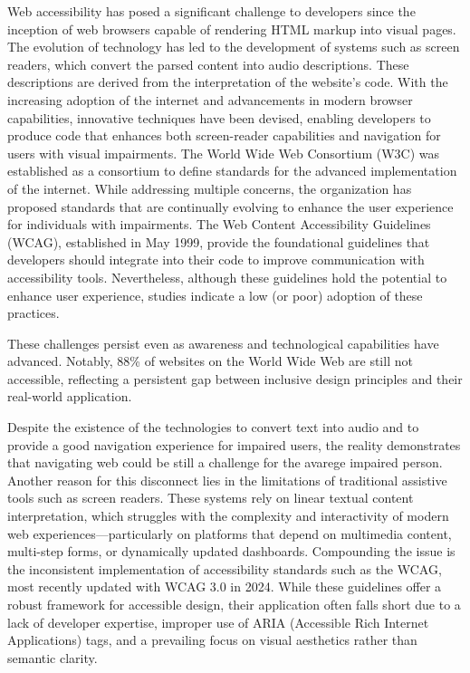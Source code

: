 \documentclass[conference]{IEEEtran}
\begin{document}
Web accessibility has posed a significant challenge to developers since the inception of web browsers capable of rendering HTML markup into visual pages. The evolution of technology has led to the development of systems such as screen readers, which convert the parsed content into audio descriptions. These descriptions are derived from the interpretation of the website's code. With the increasing adoption of the internet and advancements in modern browser capabilities, innovative techniques have been devised, enabling developers to produce code that enhances both screen-reader capabilities and navigation for users with visual impairments. The World Wide Web Consortium (W3C) was established as a consortium to define standards for the advanced implementation of the internet. While addressing multiple concerns, the organization has proposed standards that are continually evolving to enhance the user experience for individuals with impairments. The Web Content Accessibility Guidelines (WCAG), established in May 1999, provide the foundational guidelines that developers should integrate into their code to improve communication with accessibility tools. Nevertheless, although these guidelines hold the potential to enhance user experience, studies indicate a low (or poor) adoption of these practices. \cite{abuaddous2016web, antonelli2018survey} 

These challenges persist even as awareness and technological capabilities have advanced. Notably, 88\% of websites on the World Wide Web are still not accessible, reflecting a persistent gap between inclusive design principles and their real-world application. \cite{webaccess2024, martins2024large}

Despite the existence of the technologies to convert text into audio and to provide a good navigation experience for impaired users, the reality demonstrates that navigating web could be still a challenge for the avarege impaired person. Another reason for this disconnect lies in the limitations of traditional assistive tools such as screen readers. These systems rely on linear textual content interpretation, which struggles with the complexity and interactivity of modern web experiences—particularly on platforms that depend on multimedia content, multi-step forms, or dynamically updated dashboards. Compounding the issue is the inconsistent implementation of accessibility standards such as the WCAG, most recently updated with WCAG 3.0 in 2024. While these guidelines offer a robust framework for accessible design, their application often falls short due to a lack of developer expertise, improper use of ARIA (Accessible Rich Internet Applications) tags, and a prevailing focus on visual aesthetics rather than semantic clarity. \cite{gbd2021, wcagchallenges2025}
\end{document}
